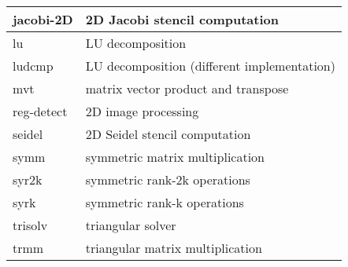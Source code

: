 \begin{tabular}{|l|l|}
    jacobi-2D               & 2D Jacobi stencil computation                       \\ \hline
    lu                      & LU decomposition                                    \\ \hline
    ludcmp                  & LU decomposition (different implementation)         \\ \hline
    mvt                     & matrix vector product and transpose                 \\ \hline
    reg-detect              & 2D image processing                                 \\ \hline
    seidel                  & 2D Seidel stencil computation                       \\ \hline
    symm                    & symmetric matrix multiplication                     \\ \hline
    syr2k                   & symmetric rank-2k operations                        \\ \hline
    syrk                    & symmetric rank-k operations                         \\ \hline
    trisolv                 & triangular solver                                   \\ \hline
    trmm                    & triangular matrix multiplication                    \\ \hline
\end{tabular}